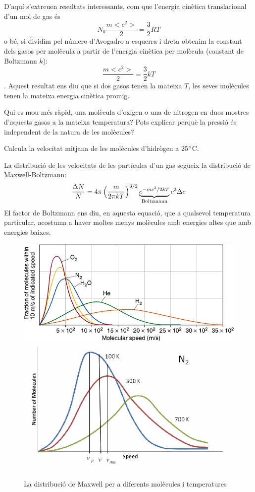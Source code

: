 D'aquí s'extreuen resultats interessants, com que l'energia cinètica translacional d'un mol de gas és \[N_0 \frac{m <c^2>}{2}=\frac{3}{2} RT\] o bé, si dividim pel número d'Avogadro a esquerra i dreta obtenim la constant dels gasos per molècula a partir de l'energia cinètica per molècula (constant de Boltzmann $k$): \[\frac{m <c^2>}{2}=\frac{3}{2} kT\].
Aquest resultat ens diu que si dos gasos tenen la mateixa $T$, les seves molècules tenen la mateixa energia cinètica promig. 
\begin{exr}
Qui es mou més ràpid, una molècula d'oxigen o una de nitrogen en dues mostres d'aquests gasos a la mateixa temperatura? Pots explicar perquè la pressió és independent de la natura de les molècules?
\end{exr}

\begin{exr}
Calcula la velocitat mitjana de les molècules d'hidrògen a 25$\degree$C.
\end{exr}

La distribució de les velocitats de les partícules d'un gas segueix la distribució de Maxwell-Boltzmann:
\[
\frac{\Delta N}{N}=4 \pi \left( \frac{m}{2 \pi kT}\right)^{3/2} \underbrace{e^{-mc^2/2kT}}_{\rm Boltzmann} c^2 \Delta c
\]
El factor de Boltzmann ens diu, en aquesta equació, que a qualsevol temperatura particular, acostuma a haver moltes menys molècules amb energies altes que amb energies baixes.
\begin{figure}[h]
\centering
\includegraphics[scale=0.5]{figures/BolzDist.png}
\includegraphics[scale=0.5]{figures/MXDIST.png}
\caption{La distribució de Maxwell per a diferents molècules i temperatures}
\label{fig:TeoriaCinetica}
\end{figure}

